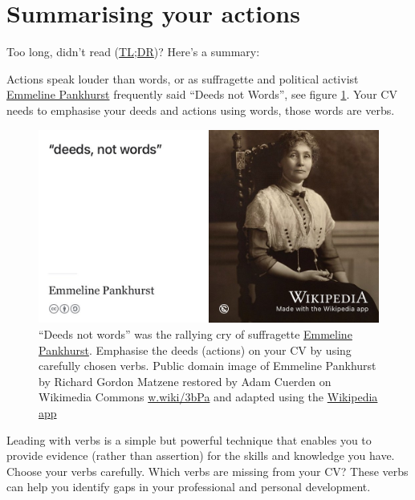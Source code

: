 \documentclass[
]{book}
\begin{document}
\hypertarget{summarising-your-actions}{%
\section{Summarising your actions}\label{summarising-your-actions}}

Too long, didn't read (\href{https://en.wiktionary.org/wiki/too_long;_didn\%27t_read}{TL;DR})? Here's a summary:

Actions speak louder than words, or as suffragette and political activist \href{https://en.wikipedia.org/wiki/Emmeline_Pankhurst}{Emmeline Pankhurst} frequently said ``Deeds not Words'', see figure \ref{fig:pankhurst-fig}. Your CV needs to emphasise your deeds and actions using words, those words are verbs.

\begin{figure}

{\centering \includegraphics[width=1\linewidth]{images/deeds-not-words-pankhurst} 

}

\caption{``Deeds not words'' was the rallying cry of suffragette \href{https://en.wikipedia.org/wiki/Emmeline_Pankhurst}{Emmeline Pankhurst}. Emphasise the deeds (actions) on your CV by using carefully chosen verbs. Public domain image of Emmeline Pankhurst by Richard Gordon Matzene restored by Adam Cuerden on Wikimedia Commons \href{https://w.wiki/3bPa}{w.wiki/3bPa} and adapted using the \href{https://apps.apple.com/gb/app/wikipedia/id324715238}{Wikipedia app}}\label{fig:pankhurst-fig}
\end{figure}



Leading with verbs is a simple but powerful technique that enables you to provide evidence (rather than assertion) for the skills and knowledge you have. Choose your verbs carefully. Which verbs are missing from your CV? These verbs can help you identify gaps in your professional and personal development.
\end{document}
